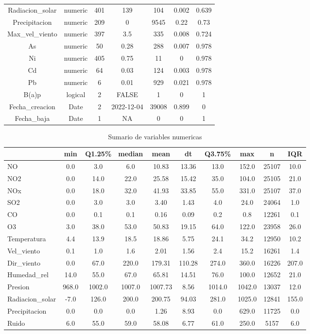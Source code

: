 \documentclass[notspecified,article,submit,moreauthors,pdftex]{Definitions/mdpi}
\begin{document}
\begin{table}[H]
\begin{tabular}[t]{ccccccc}
Radiacion\_solar & numeric & 401 & 139 & 104 & 0.002 & 0.639\\
\addlinespace
Precipitacion & numeric & 209 & 0 & 9545 & 0.22 & 0.73\\
Max\_vel\_viento & numeric & 397 & 3.5 & 335 & 0.008 & 0.724\\
As & numeric & 50 & 0.28 & 288 & 0.007 & 0.978\\
Ni & numeric & 405 & 0.75 & 11 & 0 & 0.978\\
Cd & numeric & 64 & 0.03 & 124 & 0.003 & 0.978\\
\addlinespace
Pb & numeric & 6 & 0.01 & 929 & 0.021 & 0.978\\
B(a)p & logical & 2 & FALSE & 1 & 0 & 1\\
Fecha\_creacion & Date & 2 & 2022-12-04 & 39008 & 0.899 & 0\\
Fecha\_baja & Date & 1 & NA & 0 & 0 & 1\\
\bottomrule
\end{tabular}
\end{table}

\begin{table}[H]

\caption{\label{tab:unnamed-chunk-10}Sumario de variables numericas\label{tabla:anexo3}}
\fontsize{7}{9}\selectfont
\begin{tabular}[t]{lccccccccc}
\toprule
  & min & Q1.25\% & median & mean & dt & Q3.75\% & max & n & IQR\\
\midrule
NO & 0.0 & 3.0 & 6.0 & 10.83 & 13.36 & 13.0 & 152.0 & 25107 & 10.0\\
NO2 & 0.0 & 14.0 & 22.0 & 25.58 & 15.42 & 35.0 & 104.0 & 25105 & 21.0\\
NOx & 0.0 & 18.0 & 32.0 & 41.93 & 33.85 & 55.0 & 331.0 & 25107 & 37.0\\
SO2 & 0.0 & 3.0 & 3.0 & 3.40 & 1.43 & 4.0 & 24.0 & 24064 & 1.0\\
CO & 0.0 & 0.1 & 0.1 & 0.16 & 0.09 & 0.2 & 0.8 & 12261 & 0.1\\
\addlinespace
O3 & 3.0 & 38.0 & 53.0 & 50.83 & 19.15 & 64.0 & 122.0 & 23958 & 26.0\\
Temperatura & 4.4 & 13.9 & 18.5 & 18.86 & 5.75 & 24.1 & 34.2 & 12950 & 10.2\\
Vel\_viento & 0.1 & 1.0 & 1.6 & 2.01 & 1.56 & 2.4 & 15.2 & 16261 & 1.4\\
Dir\_viento & 0.0 & 67.0 & 220.0 & 179.31 & 110.28 & 274.0 & 360.0 & 16226 & 207.0\\
Humedad\_rel & 14.0 & 55.0 & 67.0 & 65.81 & 14.51 & 76.0 & 100.0 & 12652 & 21.0\\
\addlinespace
Presion & 968.0 & 1002.0 & 1007.0 & 1007.73 & 8.56 & 1014.0 & 1042.0 & 13037 & 12.0\\
Radiacion\_solar & -7.0 & 126.0 & 200.0 & 200.75 & 94.03 & 281.0 & 1025.0 & 12841 & 155.0\\
Precipitacion & 0.0 & 0.0 & 0.0 & 1.26 & 8.93 & 0.0 & 629.0 & 11725 & 0.0\\
Ruido & 6.0 & 55.0 & 59.0 & 58.08 & 6.77 & 61.0 & 250.0 & 5157 & 6.0\\
\bottomrule
\end{tabular}
\end{table}
\end{document}
